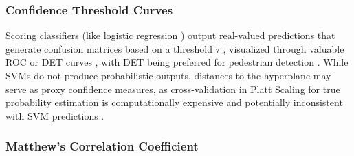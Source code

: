 \subsubsection{Confidence Threshold Curves}

Scoring classifiers (like logistic regression \cite{cornell_log_regression_notes}) output real-valued predictions that generate confusion matrices based on a threshold $\tau$ \cite{chicco_jurman_2020_mcc_f1}, visualized through valuable ROC or DET curves \cite{martin1997det}, with DET being preferred for pedestrian detection \cite{dalal_2005_histograms} \cite{dollar_2012_pedestrian}. While SVMs do not produce probabilistic outputs, distances to the hyperplane may serve as proxy confidence measures, as cross-validation in Platt Scaling \cite{platt1999probabilistic} for true probability estimation is computationally expensive and potentially inconsistent with SVM predictions \cite{scikit-learn_svm}.

\subsubsection{Matthew's Correlation Coefficient}

